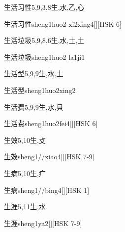 \begin{Entry}{生活习性}{5,9,3,8}{⽣,⽔,⼄,⼼}
  \begin{Phonetics}{生活习性}{sheng1huo2 xi2xing4}[][HSK 6]
  \end{Phonetics}
\end{Entry}

\begin{Entry}{生活垃圾}{5,9,8,6}{⽣,⽔,⼟,⼟}
  \begin{Phonetics}{生活垃圾}{sheng1huo2 la1ji1}
  \end{Phonetics}
\end{Entry}

\begin{Entry}{生活型}{5,9,9}{⽣,⽔,⼟}
  \begin{Phonetics}{生活型}{sheng1huo2xing2}
  \end{Phonetics}
\end{Entry}

\begin{Entry}{生活费}{5,9,9}{⽣,⽔,⾙}
  \begin{Phonetics}{生活费}{sheng1huo2fei4}[][HSK 6]
  \end{Phonetics}
\end{Entry}

\begin{Entry}{生效}{5,10}{⽣,⽁}
  \begin{Phonetics}{生效}{sheng1//xiao4}[][HSK 7-9]
  \end{Phonetics}
\end{Entry}

\begin{Entry}{生病}{5,10}{⽣,⽧}
  \begin{Phonetics}{生病}{sheng1//bing4}[][HSK 1]
  \end{Phonetics}
\end{Entry}

\begin{Entry}{生涯}{5,11}{⽣,⽔}
  \begin{Phonetics}{生涯}{sheng1ya2}[][HSK 7-9]
  \end{Phonetics}
\end{Entry}

